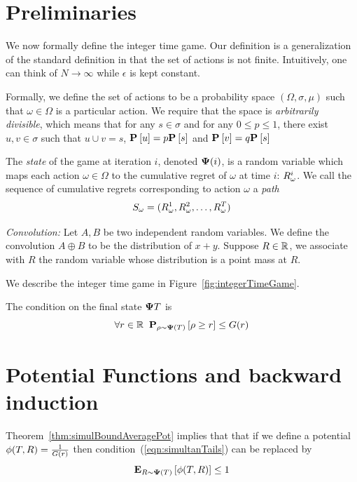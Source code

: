 \documentclass{article}[12pt]
\begin{document}
\section{Preliminaries} \label{sec:preliminaries}

We now formally define the integer time game. Our definition is a
generalization of the standard definition in that the set of actions
is not finite. Intuitively, one can think of $N \to \infty$ while
$\epsilon$ is kept constant.

Formally, we define the set of actions
to be a probability space $(\Omega,\sigma,\mu)$ such that
$\omega \in \Omega$ is a particular action. We require that the space
is {\em arbitrarily divisible}, which means that for any
$s \in \sigma$ and for any $0\leq p \leq 1$, there exist
$u,v \in \sigma$ such that $u \cup v = s$, $\P{}{u}=p\P{}{s}$ and
$\P{}{v}=q\P{}{s}$

The {\em state} of the game at iteration $i$, denoted $\state(i)$, is
a random variable which maps each action $\omega \in \Omega$ to the
cumulative regret of $\omega$ at time $i$: $\R_\omega^i$. We 
call the sequence of cumulative regrets corresponding to action
$\omega$ a {\em path}
\begin{equation} \label{eqn:path}
  S_{\omega}=(\R_\omega^1,\R_\omega^2,\ldots,\R_\omega^T)
\end{equation}

{\em Convolution:} Let $A,B$ be two independent random variables. We define the
convolution $A \oplus B$ to be the distribution of $x+y$.
Suppose $R \in \reals$, we associate with $R$ the random variable
whose distribution is a point mass at $R$.

We describe the integer time game in Figure~\ref{fig:integerTimeGame}.

The condition on the final state $\state{T}$ is
\begin{equation} \label{eqn:simultanTails}
    \forall r \in \reals \;\; \P{\rho \sim \state(T)}{\rho \geq r} \leq G(r)
\end{equation}

\section{Potential Functions and backward induction}


Theorem~\ref{thm:simulBoundAveragePot} implies that 
that if we define a potential $\pot(T,R) = \frac{1}{G(r)}$ then
condition~(\ref{eqn:simultanTails}) can be replaced by
\begin{equation} \label{eqn:PotBound}
   \E{\R \sim \state(T)}{\pot(T,\R)} \leq 1
 \end{equation}
\end{document}
